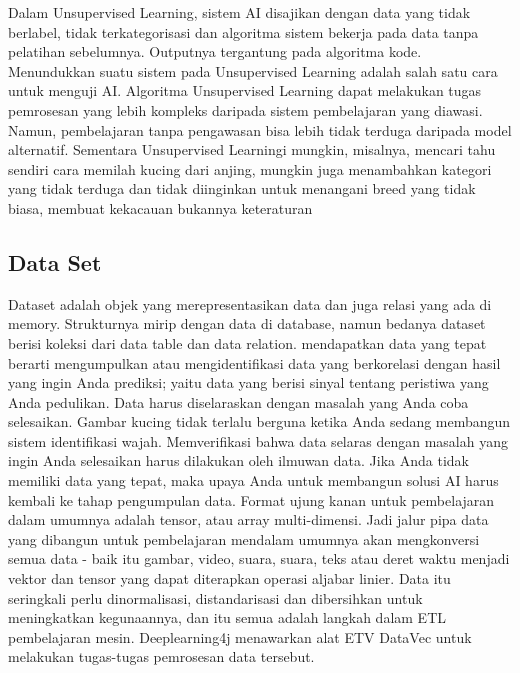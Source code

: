 Dalam Unsupervised Learning, sistem AI disajikan dengan data yang tidak berlabel, tidak terkategorisasi dan algoritma sistem bekerja pada data tanpa pelatihan sebelumnya. Outputnya tergantung pada algoritma kode. Menundukkan suatu sistem pada Unsupervised Learning adalah salah satu cara untuk menguji AI. Algoritma Unsupervised Learning dapat melakukan tugas pemrosesan yang lebih kompleks daripada sistem pembelajaran yang
diawasi. Namun, pembelajaran tanpa pengawasan bisa lebih tidak terduga daripada model alternatif. Sementara Unsupervised Learningi mungkin, misalnya, mencari tahu sendiri cara memilah kucing dari anjing, mungkin juga menambahkan kategori yang tidak terduga dan tidak diinginkan untuk menangani breed yang tidak biasa, membuat kekacauan bukannya keteraturan

\subsection{Data Set}
Dataset adalah objek yang merepresentasikan data dan juga relasi yang ada di memory. Strukturnya mirip dengan data di database, namun bedanya
dataset berisi koleksi dari data table dan data relation. mendapatkan data yang tepat berarti mengumpulkan atau mengidentifikasi data yang berkorelasi dengan hasil yang ingin Anda prediksi; yaitu data yang berisi sinyal tentang peristiwa yang Anda pedulikan. Data harus diselaraskan dengan masalah yang Anda coba selesaikan. Gambar kucing tidak terlalu berguna ketika Anda sedang membangun sistem identifikasi wajah. Memverifikasi bahwa data selaras dengan masalah yang ingin Anda selesaikan harus dilakukan oleh ilmuwan data. Jika Anda tidak memiliki data yang tepat, maka upaya Anda untuk membangun solusi AI harus kembali ke tahap pengumpulan data. Format ujung kanan untuk pembelajaran dalam umumnya adalah tensor, atau array multi-dimensi. Jadi jalur pipa data yang dibangun untuk pembelajaran mendalam umumnya akan mengkonversi semua data - baik itu gambar, video, suara, suara, teks atau deret waktu  menjadi vektor dan tensor yang dapat diterapkan operasi aljabar linier. Data itu seringkali perlu dinormalisasi, distandarisasi dan dibersihkan untuk meningkatkan kegunaannya, dan itu semua adalah langkah dalam ETL pembelajaran mesin. Deeplearning4j menawarkan alat ETV DataVec untuk melakukan tugas-tugas pemrosesan data tersebut.

